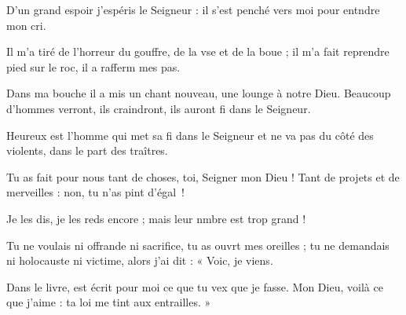 \item D’un grand espoir j’espéris le Seigneur :\psstar{} il s’est penché vers moi pour entndre mon cri.
\item Il m’a tiré de l’horreur du gouffre, de la vse et de la boue ;\psstar{} il m’a fait reprendre pied sur le roc, il a rafferm mes pas.
\item Dans ma bouche il a mis un chant nouveau, une lounge à notre Dieu.\psstar{} Beaucoup d’hommes verront, ils craindront, ils auront fi dans le Seigneur.
\item Heureux est l’homme qui met sa fi dans le Seigneur\psstar{} et ne va pas du côté des violents, dans le part des traîtres.
\item Tu as fait pour nous tant de choses, toi, Seigner mon Dieu !\psstar{} Tant de projets et de merveilles : non, tu n’as pint d’égal ! 
\item Je les dis, je les reds encore ;\psstar{} mais leur nmbre est trop grand !
\item Tu ne voulais ni offrande ni sacrifice, tu as ouvrt mes oreilles ;\psstar{} tu ne demandais ni holocauste ni victime, alors j’ai dit : « Voic, je viens.
\item Dans le livre, est écrit pour moi ce que tu vex que je fasse.\psstar{} Mon Dieu, voilà ce que j’aime : ta loi me tint aux entrailles. »